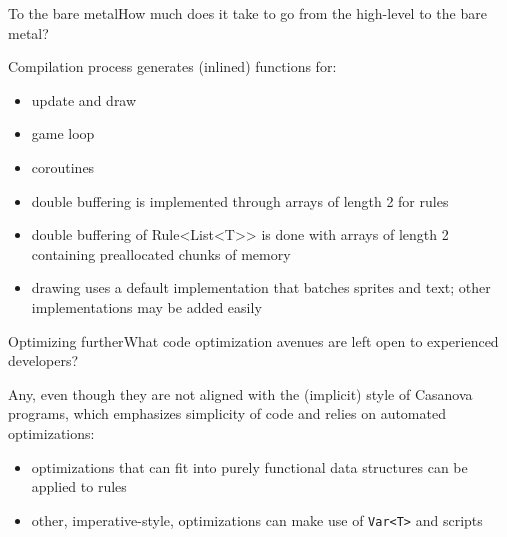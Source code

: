 \documentclass{beamer}
\begin{document}
\begin{slide}{To the bare metal}{How much does it take to go from the high-level to the bare metal?}{
\item Compilation process generates (inlined) functions for:
\begin{itemize}
\item  update and draw
\item game loop
\item coroutines
\item double buffering is implemented through arrays of length 2 for rules
\item double buffering of Rule<List<T>> is done with arrays of length 2 containing preallocated chunks of memory
\item drawing uses a default implementation that batches sprites and text; other implementations may be added easily
\end{itemize}
}\end{slide}

\begin{slide}{Optimizing further}{What code optimization avenues are left open to experienced developers?}{
\item Any, even though they are not aligned with the (implicit) style of Casanova programs, which emphasizes simplicity of code and relies on automated optimizations:
\begin{itemize}
\item optimizations that can fit into purely functional data structures can be applied to rules
\item other, imperative-style, optimizations can make use of \texttt{Var<T>} and scripts
\end{itemize}
}\end{slide}
\end{document}

